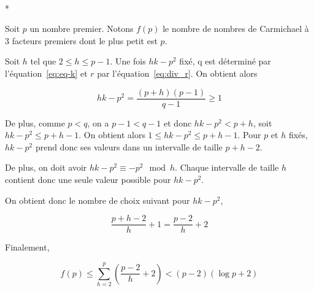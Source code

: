 \documentclass[a4paper]{article}
\newenvironment{myproof}[1][\proofname]{\proof[#1]\mbox{}\\*}{\endproof}
\renewcommand{\eqref}[1]{équation~\ref{#1}}
\begin{document}
\begin{myproof}

Soit $p$ un nombre premier. Notons $f(p)$ le nombre de nombres de Carmichael à 3 facteurs
premiers dont le plus petit est $p$.

Soit $h$ tel que $2 \leq h \leq p-1$. Une fois $hk - p^2$ fixé, q est
déterminé par l'\eqref{eq:eq-k} et $r$ par l'\eqref{eq:div_r}. On obtient
alors

$$ hk - p^2 = \frac{(p+h)(p-1)}{q-1} \geq 1$$

De plus, comme $p < q$, on a $p-1 < q-1$ et donc $hk - p^2 < p + h$, soit $hk -
p^2 \leq p + h - 1$. On obtient alors $ 1 \leq hk - p^2 \leq p + h -
1$. Pour $p$ et $h$ fixés, $hk - p^2$ prend donc ses valeurs dans un
intervalle de taille $p + h - 2$. 

De plus, on doit avoir $hk - p^2 \equiv -p^2 \mod h$. Chaque intervalle de
taille $h$ contient donc une seule valeur possible pour $hk - p^2$.

On obtient donc le nombre de choix suivant pour $hk - p^2$,

    $$ \frac{p+h-2}{h} + 1 = \frac{p-2}{h} + 2$$

Finalement,

    $$ f(p) \leq \sum_{h=2}^{p} (\frac{p-2}{h} + 2) < (p-2)(\log p+2)$$

\end{myproof}
\end{document}
